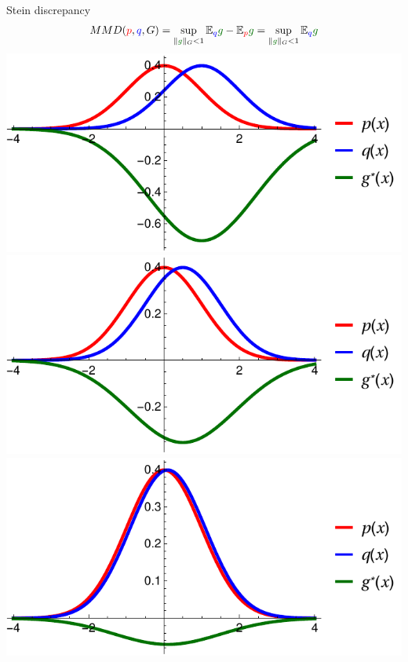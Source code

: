 \begin{frame}
\begin{columns}
\begin{column}{.33\linewidth}
\begin{block}{Stein discrepancy}
\large
\begin{align*}
MMD({\color{red} p},{ \color{blue} q},G) = \sup_{   \| {\color{mg} g} \|_G<1} \ev_{{ \color{blue} q}}{\color{mg}g} - \ev_{{\color{red} p}} {\color{mg}g}  = \sup_{ \| {\color{mg} g} \|_G<1} \ev_{{ \color{blue} q}} {\color{mg}g} 
\end{align*}
\vspace{2cm}
\centering
\includegraphics[scale=1.2]{../../presentation/img/s1.pdf}
\includegraphics[scale=1.2]{../../presentation/img/s05.pdf}\\
\includegraphics[scale=1.2]{../../presentation/img/s01.pdf}

\end{block}
\end{column}
\end{columns}
\end{frame}
